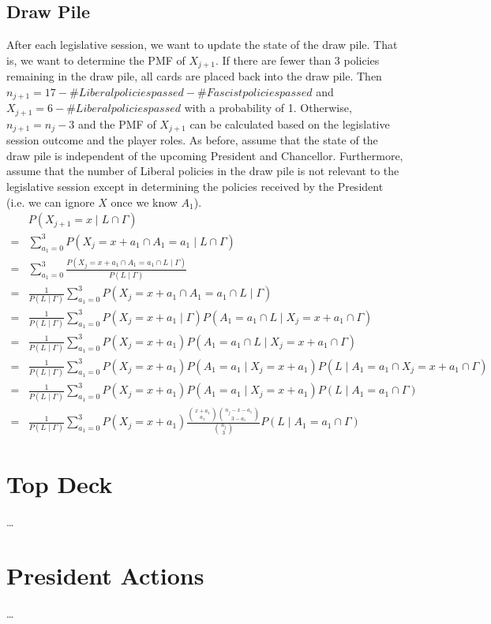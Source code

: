 \documentclass[fleqn, 12pt, letterpaper]{article}
\begin{document}
\subsection{Draw Pile}
After each legislative session, we want to update the state of the draw pile. That is, we want to determine the PMF of $X_{j+1}$. If there are fewer than 3 policies remaining in the draw pile, all cards are placed back into the draw pile. Then $n_{j+1} = 17 - \#Liberal policies passed - \#Fascist policies passed$ and $X_{j+1} = 6 - \#Liberal policies passed$ with a probability of 1. Otherwise, $n_{j+1} = n_j - 3$ and the PMF of $X_{j+1}$ can be calculated based on the legislative session outcome and the player roles. As before, assume that the state of the draw pile is independent of the upcoming President and Chancellor. Furthermore, assume that the number of Liberal policies in the draw pile is not relevant to the legislative session except in determining the policies received by the President (i.e. we can ignore $X$ once we know $A_1$).
\begin{align*}
	& P(X_{j+1}=x \mid L \cap \Gamma) \\
	={}& \sum_{a_1=0}^3 P(X_j=x+a_1 \cap A_1=a_1 \mid L \cap \Gamma) \\
	={}& \sum_{a_1=0}^3 \frac{P(X_j=x+a_1 \cap A_1=a_1 \cap L \mid \Gamma)}{P(L \mid \Gamma)} \\
	={}& \frac{1}{P(L \mid \Gamma)} \sum_{a_1=0}^3 P(X_j=x+a_1 \cap A_1=a_1 \cap L \mid \Gamma) \\
	={}& \frac{1}{P(L \mid \Gamma)} \sum_{a_1=0}^3 P(X_j=x+a_1 \mid \Gamma) P(A_1=a_1 \cap L \mid X_j=x+a_1 \cap \Gamma) \\
	={}& \frac{1}{P(L \mid \Gamma)} \sum_{a_1=0}^3 P(X_j=x+a_1) P(A_1=a_1 \cap L \mid X_j=x+a_1 \cap \Gamma) \\
	={}& \frac{1}{P(L \mid \Gamma)} \sum_{a_1=0}^3 P(X_j=x+a_1) P(A_1=a_1 \mid X_j=x+a_1) P(L \mid A_1=a_1 \cap X_j=x+a_1 \cap \Gamma) \\
	={}& \frac{1}{P(L \mid \Gamma)} \sum_{a_1=0}^3 P(X_j=x+a_1) P(A_1=a_1 \mid X_j=x+a_1) P(L \mid A_1=a_1 \cap \Gamma) \\
	={}& \frac{1}{P(L \mid \Gamma)} \sum_{a_1=0}^3 P(X_j=x+a_1) \frac{\binom{x+a_1}{a_1} \binom{n_j-x-a_1}{3-a_1}}{\binom{n_j}{3}} P(L \mid A_1=a_1 \cap \Gamma)
\end{align*}

\newpage
\section{Top Deck}
\dots

\section{President Actions}
\dots
\end{document}
